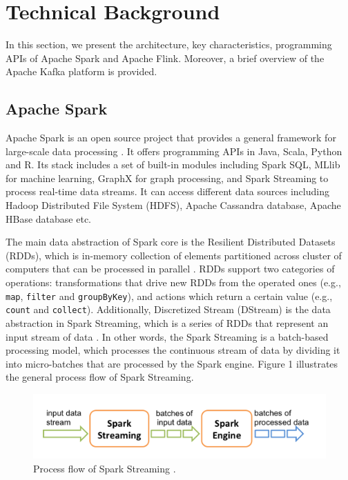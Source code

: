 \documentclass[]{article}
\begin{document}
\section{Technical Background}
 In this section, we present the architecture, key characteristics, programming APIs  of Apache Spark and Apache Flink. Moreover, a brief overview of the Apache Kafka platform is  provided.

\subsection{Apache Spark}

\par Apache Spark is an open source project that provides a general framework for large-scale data processing \cite{spark}. It offers programming APIs in Java, Scala, Python and R. Its stack includes a set of built-in modules including Spark SQL, MLlib for machine learning, GraphX for graph processing, and Spark Streaming to process real-time data streams. It can access different data sources including Hadoop Distributed File System (HDFS), Apache Cassandra database, Apache HBase database etc.

\par The main data abstraction of Spark core is the Resilient Distributed Datasets (RDDs), which is in-memory collection of elements partitioned across cluster of computers that can be processed in parallel \cite{rdd}. RDDs support two categories of operations: transformations that drive new RDDs from the operated ones (e.g., \texttt{map}, \texttt{filter} and \texttt{groupByKey}), and actions which return a certain value (e.g., \texttt{count} and \texttt{collect}). Additionally, Discretized Stream (DStream) is the data abstraction in Spark Streaming, which is a series of RDDs that represent an input stream of data \cite{spark_streaming}. In other words, the Spark Streaming is a batch-based processing model, which processes the continuous stream of data by dividing it into micro-batches that are  processed by the Spark engine. Figure 1 illustrates the general process flow of Spark Streaming. 


\begin{figure}[h]
 
  \centering
    \includegraphics[width=.9\textwidth, height=.2\textheight]{streaming-flow.png}
     \caption{ Process flow of Spark Streaming \cite{spark_streaming}.}
\end{figure} 
\end{document}

